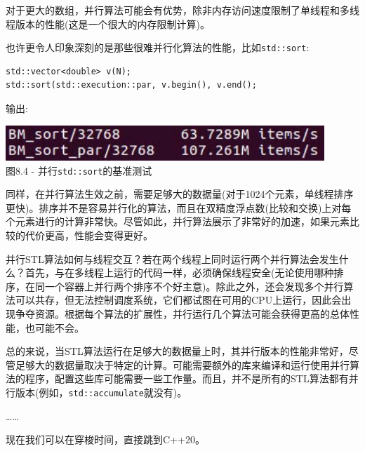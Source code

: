 对于更大的数组，并行算法可能会有优势，除非内存访问速度限制了单线程和多线程版本的性能(这是一个很大的内存限制计算)。

也许更令人印象深刻的是那些很难并行化算法的性能，比如\texttt{std::sort}:

\begin{lstlisting}[style=styleCXX]
std::vector<double> v(N);
std::sort(std::execution::par, v.begin(), v.end();
\end{lstlisting}

输出:

\begin{center}
\includegraphics[width=0.9\textwidth]{content/2/chapter8/images/4.jpg}\\
图8.4 - 并行\texttt{std::sort}的基准测试
\end{center}

同样，在并行算法生效之前，需要足够大的数据量(对于1024个元素，单线程排序更快)。排序并不是容易并行化的算法，而且在双精度浮点数(比较和交换)上对每个元素进行的计算非常快。尽管如此，并行算法展示了非常好的加速，如果元素比较的代价更高，性能会变得更好。 

并行STL算法如何与线程交互？若在两个线程上同时运行两个并行算法会发生什么？首先，与在多线程上运行的代码一样，必须确保线程安全(无论使用哪种排序，在同一个容器上并行两个排序不个好主意)。除此之外，还会发现多个并行算法可以共存，但无法控制调度系统，它们都试图在可用的CPU上运行，因此会出现争夺资源。根据每个算法的扩展性，并行运行几个算法可能会获得更高的总体性能，也可能不会。

总的来说，当STL算法运行在足够大的数据量上时，其并行版本的性能非常好，尽管足够大的数据量取决于特定的计算。可能需要额外的库来编译和运行使用并行算法的程序，配置这些库可能需要一些工作量。而且，并不是所有的STL算法都有并行版本(例如，\texttt{std::accumulate}就没有)。

……

现在我们可以在穿梭时间，直接跳到C++20。














